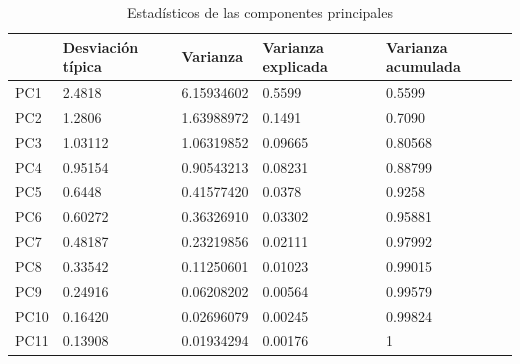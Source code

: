 \documentclass[letterpaper,11pt]{article}
\begin{document}
\begin{table}[]
\centering
\renewcommand{\tablename}{Tabla}
\begin{tabular}{lllll}
\hline
     & Desviación típica & Varianza   & Varianza explicada & Varianza acumulada \\ \hline
PC1  & 2.4818            & 6.15934602 & 0.5599             & 0.5599             \\
PC2  & 1.2806            & 1.63988972 & 0.1491             & 0.7090             \\
PC3  & 1.03112           & 1.06319852 & 0.09665            & 0.80568            \\
PC4  & 0.95154           & 0.90543213 & 0.08231            & 0.88799            \\
PC5  & 0.6448           & 0.41577420 & 0.0378            & 0.9258            \\
PC6  & 0.60272           & 0.36326910 & 0.03302            & 0.95881            \\
PC7  & 0.48187            & 0.23219856 & 0.02111             & 0.97992             \\
PC8  & 0.33542           & 0.11250601  & 0.01023            & 0.99015            \\
PC9  & 0.24916           & 0.06208202 & 0.00564            & 0.99579            \\
PC10 & 0.16420           & 0.02696079 & 0.00245            & 0.99824            \\
PC11 & 0.13908           & 0.01934294 & 0.00176            & 1                  \\ \hline
\end{tabular}
\caption{Estadísticos de las componentes principales}
\label{ACP_tabla}
\end{table}
\end{document}
